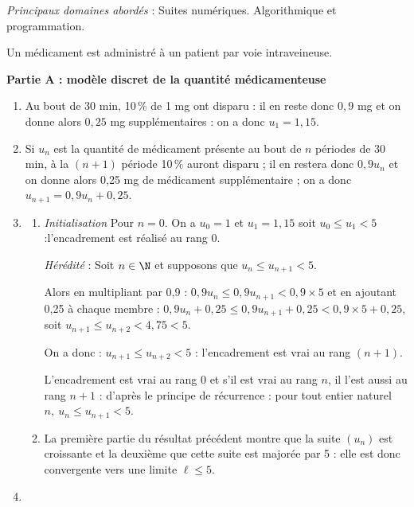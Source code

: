 \medskip

\emph{Principaux domaines abordés} : Suites numériques. Algorithmique et programmation.

\medskip

Un médicament est administré à un patient par voie intraveineuse. 

\bigskip

\textbf{Partie A : modèle discret de la quantité médicamenteuse}

\medskip











\begin{enumerate}
\item 
Au bout de 30 min, 10\,\% de 1 mg ont disparu : il en reste donc $0,9$ mg et on donne alors $0,25$ mg supplémentaires : on a donc $u_1 = 1,15$.
\item 

Si $u_n$ est la quantité de médicament présente au bout de $n$ périodes de 30 min, à la $(n + 1)$ période 10\,\% auront disparu ; il en restera donc $0,9u_n$ et on donne alors 0,25 mg de médicament supplémentaire ; on a donc $u_{n+1} = 0,9u_n + 0,25$.
\item 
	\begin{enumerate}
		\item 
		\emph{Initialisation} Pour $n = 0$.
On a $u_0 = 1$ et $u_1 = 1,15$  soit $u_0 \leqslant u_1 < 5$ :l'encadrement est réalisé au rang $0$.

\emph{Hérédité} : Soit $n \in \N$ et supposons que $u_n \leqslant  u_{n+1} < 5$.

Alors en multipliant par 0,9 : $0,9u_n \leqslant 0,9u_{n+1} < 0,9 \times 5$ et en ajoutant 0,25 à chaque membre : $0,9u_n + 0,25 \leqslant 0,9u_{n+1} + 0,25  < 0,9 \times 5 + 0,25$, soit $u_{n+1} \leqslant u_{n+2} < 4,75 < 5$.

On a donc : $u_{n+1} \leqslant u_{n+2} <  5$ : l'encadrement est vrai au rang $(n + 1)$.

L'encadrement est vrai au rang $0$ et s'il est vrai au rang $n$, il l'est aussi au rang $n + 1$ : d'après le principe de récurrence : pour tout entier naturel $n,\: u_n \leqslant  u_{n+1} < 5$.
		\item 
La première partie du résultat précédent montre que la suite $\left(u_n\right)$ est croissante et la deuxième que cette suite est majorée par 5 : elle est donc convergente vers une limite $\ell \leqslant 5$.
	\end{enumerate}
\item 


\end{enumerate}
